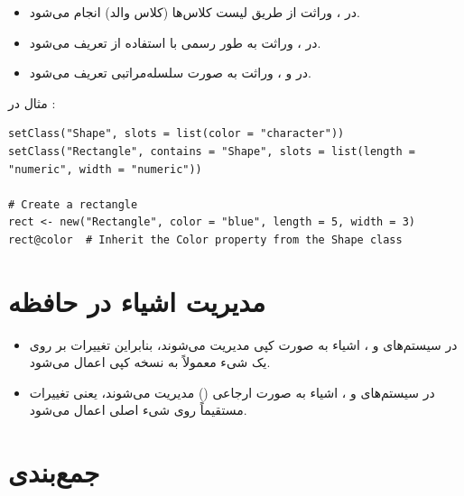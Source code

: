 \documentclass[11pt, a4paper, oneside]{book}
\begin{document}
		 	\begin{itemize}
		 		
		 		\item در ، وراثت از طریق لیست کلاس‌ها (کلاس والد) انجام می‌شود.
		 		
		 		\item در ، وراثت به طور رسمی با استفاده از  تعریف می‌شود.
		 		
		 		\item در  و ، وراثت به صورت سلسله‌مراتبی تعریف می‌شود.
		 		
		 	\end{itemize}
		 	
		 	مثال در :
		 
		 	\begin{latin}
		 		\begin{lstlisting}[caption={\lr{Inheritance}}] 
setClass("Shape", slots = list(color = "character"))
setClass("Rectangle", contains = "Shape", slots = list(length = "numeric", width = "numeric"))

# Create a rectangle
rect <- new("Rectangle", color = "blue", length = 5, width = 3)
rect@color  # Inherit the Color property from the Shape class

		 		\end{lstlisting}
		 	\end{latin}
		 
		 \section{مدیریت اشیاء در حافظه}
		 
		 	\begin{itemize}
		 		
		 		\item در سیستم‌های  و ، اشیاء به صورت کپی مدیریت می‌شوند، بنابراین تغییرات بر روی یک شیء معمولاً به نسخه کپی اعمال می‌شود.
		 		
		 		\item در سیستم‌های  و ، اشیاء به صورت ارجاعی () مدیریت می‌شوند، یعنی تغییرات مستقیماً روی شیء اصلی اعمال می‌شود.
		 		
		 	\end{itemize}
		 
		 \section{جمع‌بندی}
		 
\end{document}
